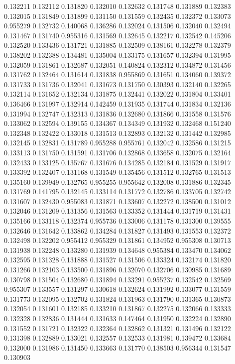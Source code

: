 0.132211
0.132112
0.131820
0.132010
0.132632
0.131748
0.131889
0.132383
0.132015
0.131849
0.131899
0.131150
0.131559
0.132435
0.132372
0.133073
0.955279
0.132732
0.140068
0.136286
0.132024
0.131506
0.132040
0.132494
0.131467
0.131740
0.955316
0.131569
0.132645
0.132217
0.132542
0.145206
0.132520
0.133436
0.131721
0.131885
0.132509
0.138161
0.132278
0.132379
0.138202
0.132388
0.134481
0.135004
0.133175
0.131657
0.132394
0.131995
0.132059
0.131861
0.132687
0.132051
0.140824
0.132312
0.134872
0.131456
0.131762
0.132464
0.131614
0.131838
0.955869
0.131651
0.134060
0.139372
0.131733
0.131736
0.132041
0.131673
0.131750
0.130393
0.132140
0.132265
0.132114
0.131652
0.132134
0.131875
0.132441
0.132022
0.131804
0.133401
0.136466
0.131997
0.132914
0.142459
0.131935
0.131744
0.131834
0.132136
0.131994
0.132747
0.132313
0.131836
0.132680
0.131866
0.131558
0.131576
0.133062
0.132594
0.139155
0.134367
0.134349
0.131932
0.132468
0.151240
0.132348
0.132422
0.133018
0.131513
0.132893
0.132132
0.131442
0.132985
0.132145
0.132831
0.131789
0.955288
0.955761
0.132042
0.132586
0.131215
0.133113
0.131750
0.131591
0.131706
0.132868
0.133658
0.132075
0.132164
0.132433
0.133125
0.135767
0.131676
0.134285
0.132184
0.131529
0.131917
0.133392
0.132407
0.131168
0.131549
0.135456
0.131512
0.132765
0.131513
0.135160
0.139949
0.132765
0.955255
0.955642
0.132008
0.131886
0.132345
0.131769
0.141795
0.132145
0.133114
0.131772
0.132786
0.133705
0.132742
0.131607
0.132430
0.955083
0.131871
0.133607
0.132272
0.138500
0.131012
0.132046
0.131209
0.131356
0.131563
0.133352
0.131444
0.131719
0.131431
0.135166
0.133118
0.132374
0.955736
0.133006
0.131178
0.131300
0.139555
0.132646
0.131642
0.133862
0.134284
0.131827
0.131493
0.131553
0.132372
0.132498
0.132202
0.955412
0.955329
0.131861
0.134952
0.955308
0.130713
0.131938
0.132248
0.133280
0.131939
0.134648
0.955384
0.133470
0.134062
0.132595
0.131328
0.131888
0.131527
0.131506
0.133324
0.132174
0.131820
0.131266
0.132103
0.133500
0.131896
0.132070
0.132706
0.130985
0.131689
0.130798
0.131504
0.132680
0.131894
0.133291
0.955237
0.132542
0.132569
0.955307
0.133557
0.131297
0.130618
0.132624
0.131992
0.133077
0.131559
0.131773
0.132095
0.132702
0.131824
0.131963
0.131790
0.131365
0.130873
0.132054
0.131601
0.132185
0.133210
0.131867
0.132275
0.132066
0.133333
0.132328
0.132836
0.131444
0.131633
0.147464
0.131950
0.132224
0.132890
0.131552
0.131721
0.132322
0.132364
0.132862
0.131321
0.131496
0.132122
0.131398
0.132889
0.133021
0.132557
0.132533
0.131981
0.139472
0.133684
0.132000
0.131986
0.131450
0.133663
0.131770
0.138503
0.956344
0.131547
0.130903

